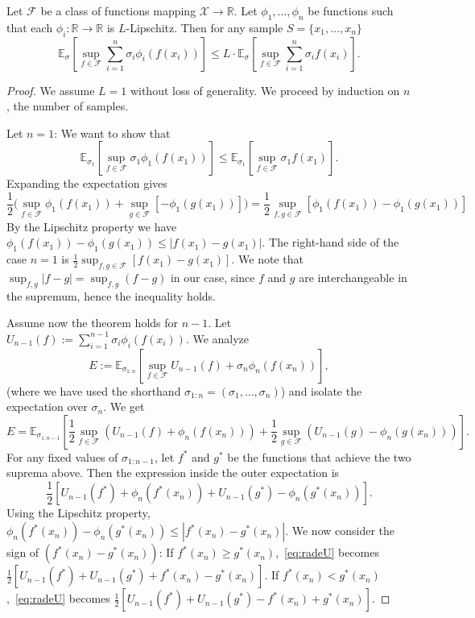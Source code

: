 \begin{theorem}\label{th:talagrandcontraction}
Let $\mathcal{F}$ be a class of functions mapping $\mathcal{X} \to \mathbb{R}$. Let $\phi_1, \dots, \phi_n$ be functions such that each $\phi_i: \mathbb{R} \to \mathbb{R}$ is $L$-Lipschitz. Then for any sample $S = \{x_1, \dots, x_n\}$
$$\mathbb{E}_{\sigma} \left[ \sup_{f \in \mathcal{F}} \sum_{i=1}^n \sigma_i \phi_i(f(x_i)) \right] \leq L \cdot \mathbb{E}_{\sigma} \left[ \sup_{f \in \mathcal{F}} \sum_{i=1}^n \sigma_i f(x_i) \right].$$
\end{theorem}

\begin{proof}
We assume $L=1$ without loss of generality. We proceed by induction on $n$, the number of samples.

Let $n=1$:
We want to show that
$$\mathbb{E}_{\sigma_1} [\sup_{f \in \mathcal{F}} \sigma_1 \phi_1(f(x_1))] \leq \mathbb{E}_{\sigma_1} [\sup_{f \in \mathcal{F}} \sigma_1 f(x_1)].$$
Expanding the expectation gives
$$\frac{1}{2} \Big( \sup_{f \in \mathcal{F}} \phi_1(f(x_1)) + \sup_{g \in \mathcal{F}} [-\phi_1(g(x_1))] \Big) = \frac{1}{2} \sup_{f, g \in \mathcal{F}} [\phi_1(f(x_1)) - \phi_1(g(x_1))]$$
By the Lipschitz property we have $\phi_1(f(x_1)) - \phi_1(g(x_1)) \leq |f(x_1) - g(x_1)|$.
The right-hand side of the case $n=1$ is $\frac{1}{2} \sup_{f, g \in \mathcal{F}} [f(x_1) - g(x_1)]$.
We note that $\sup_{f,g} |f-g| = \sup_{f,g} (f-g)$ in our case, since $f$ and $g$ are interchangeable in the supremum, hence the inequality holds.


Assume now the theorem holds for $n-1$. Let $U_{n-1}(f) := \sum_{i=1}^{n-1} \sigma_i \phi_i(f(x_i))$. We analyze
\begin{equation}\label{eq:radeE}
E := \mathbb{E}_{\sigma_{1:n}} \left[ \sup_{f \in \mathcal{F}} U_{n-1}(f) + \sigma_n \phi_n(f(x_n)) \right],
\end{equation}
(where we have used the shorthand $\sigma_{1:n} = (\sigma_1,\dots,\sigma_n)$) and isolate the expectation over $\sigma_n$. We get
$$E = \mathbb{E}_{\sigma_{1:n-1}} \left[ \frac{1}{2} \sup_{f \in \mathcal{F}} \left( U_{n-1}(f) + \phi_n(f(x_n)) \right) + \frac{1}{2} \sup_{g \in \mathcal{F}} \left( U_{n-1}(g) - \phi_n(g(x_n)) \right) \right].$$
For any fixed values of $\sigma_{1:n-1}$, let $f^*$ and $g^*$ be the functions that achieve the two suprema above. Then the expression inside the outer expectation is
\begin{equation}\label{eq:radeU}
\frac{1}{2} \left[ U_{n-1}(f^*) + \phi_n(f^*(x_n)) + U_{n-1}(g^*) - \phi_n(g^*(x_n)) \right].
\end{equation}
Using the Lipschitz property, $\phi_n(f^*(x_n)) - \phi_n(g^*(x_n)) \leq |f^*(x_n) - g^*(x_n)|$.
We now consider the sign of $(f^*(x_n) - g^*(x_n))$:
If $f^*(x_n) \geq g^*(x_n)$,~\eqref{eq:radeU} becomes $\frac{1}{2} [ U_{n-1}(f^*) + U_{n-1}(g^*) + f^*(x_n) - g^*(x_n) ]$.
If $f^*(x_n) < g^*(x_n)$,~\eqref{eq:radeU} becomes $\frac{1}{2} [ U_{n-1}(f^*) + U_{n-1}(g^*) - f^*(x_n) + g^*(x_n) ]$.


\end{proof}
